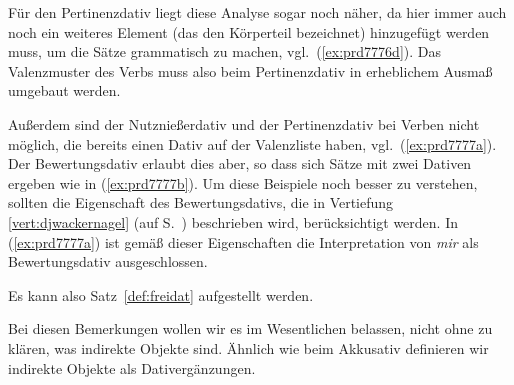 Für den Pertinenzdativ liegt diese Analyse sogar noch näher, da hier immer auch noch ein weiteres Element (das den Körperteil bezeichnet) hinzugefügt werden muss, um die Sätze grammatisch zu machen, vgl.\ (\ref{ex:prd7776d}).
Das Valenzmuster des Verbs muss also beim Pertinenzdativ in erheblichem Ausmaß umgebaut werden.

\begin{exe}
\end{exe}

Außerdem sind der Nutznießerdativ und der Pertinenzdativ bei Verben nicht möglich, die bereits einen Dativ auf der Valenzliste haben, vgl.\ (\ref{ex:prd7777a}).
Der Bewertungsdativ erlaubt dies aber, so dass sich Sätze mit zwei Dativen ergeben wie in (\ref{ex:prd7777b}).
Um diese Beispiele noch besser zu verstehen, sollten die Eigenschaft des Bewertungsdativs, die in Vertiefung \ref{vert:djwackernagel} (auf S.~\pageref{vert:djwackernagel}) beschrieben wird, berücksichtigt werden.
In (\ref{ex:prd7777a}) ist gemäß dieser Eigenschaften die Interpretation von \textit{mir} als Bewertungsdativ ausgeschlossen.

\begin{exe}
  \ex\label{ex:prd7777}
  \begin{xlist}
  \end{xlist}
\end{exe}

Es kann also Satz~\ref{def:freidat} aufgestellt werden.


Bei diesen Bemerkungen wollen wir es im Wesentlichen belassen, nicht ohne zu klären, was indirekte Objekte sind.
Ähnlich wie beim Akkusativ definieren wir indirekte Objekte als Dativergänzungen.


